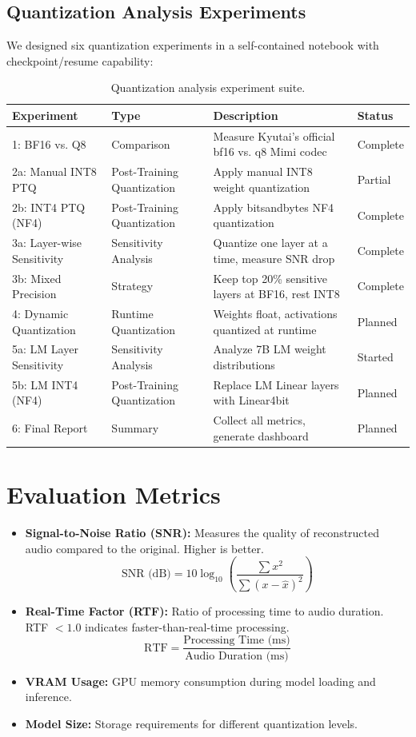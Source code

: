 \documentclass[12pt,a4paper]{report}
\begin{document}
\subsection{Quantization Analysis Experiments}
We designed six quantization experiments in a self-contained notebook with checkpoint/resume capability:

\begin{table}[H]
\centering
\caption{Quantization analysis experiment suite.}
\label{tab:quant_experiments}
\begin{tabular}{@{}llp{6cm}l@{}}
\toprule
\textbf{Experiment} & \textbf{Type} & \textbf{Description} & \textbf{Status} \\
\midrule
1: BF16 vs. Q8 & Comparison & Measure Kyutai's official bf16 vs. q8 Mimi codec & Complete \\
2a: Manual INT8 PTQ & Post-Training Quantization & Apply manual INT8 weight quantization & Partial \\
2b: INT4 PTQ (NF4) & Post-Training Quantization & Apply bitsandbytes NF4 quantization & Complete \\
3a: Layer-wise Sensitivity & Sensitivity Analysis & Quantize one layer at a time, measure SNR drop & Complete \\
3b: Mixed Precision & Strategy & Keep top 20\% sensitive layers at BF16, rest INT8 & Complete \\
4: Dynamic Quantization & Runtime Quantization & Weights float, activations quantized at runtime & Planned \\
5a: LM Layer Sensitivity & Sensitivity Analysis & Analyze 7B LM weight distributions & Started \\
5b: LM INT4 (NF4) & Post-Training Quantization & Replace LM Linear layers with Linear4bit & Planned \\
6: Final Report & Summary & Collect all metrics, generate dashboard & Planned \\
\bottomrule
\end{tabular}
\end{table}

\section{Evaluation Metrics}
\begin{itemize}
    \item \textbf{Signal-to-Noise Ratio (SNR):} Measures the quality of reconstructed audio compared to the original. Higher is better.
    \[
    \text{SNR (dB)} = 10 \log_{10} \left( \frac{\sum x^2}{\sum (x - \hat{x})^2} \right)
    \]
    \item \textbf{Real-Time Factor (RTF):} Ratio of processing time to audio duration. RTF $< 1.0$ indicates faster-than-real-time processing.
    \[
    \text{RTF} = \frac{\text{Processing Time (ms)}}{\text{Audio Duration (ms)}}
    \]
    \item \textbf{VRAM Usage:} GPU memory consumption during model loading and inference.
    \item \textbf{Model Size:} Storage requirements for different quantization levels.
\end{itemize}
\end{document}
